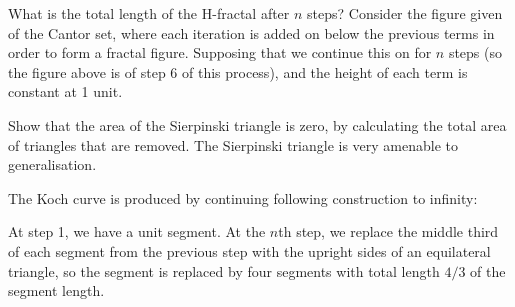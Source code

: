 \begin{questions}
  \question What is the total length of the H-fractal after $ n $ steps?
  \question Consider the figure given of the Cantor set, where each iteration is added on below the previous terms in order
            to form a fractal figure. Supposing that we continue this on for $ n $ steps (so the figure above is of step 6
            of this process), and the height of each term is constant at 1 unit.
  \question Show that the area of the Sierpinski triangle is zero, by calculating the total area of triangles that are removed.
  \question The Sierpinski triangle is very amenable to generalisation.
  \question The Koch curve is produced by continuing following construction to infinity:
            \begin{con}
              At step 1, we have a unit segment. At the $ n$th step, we replace the middle third of each segment from the previous
              step with the upright sides of an equilateral triangle, so the segment is replaced by four segments with total
              length $ 4/3 $ of the segment length.
            \end{con}
    \begin{parts}

\end{parts}
\end{questions}
